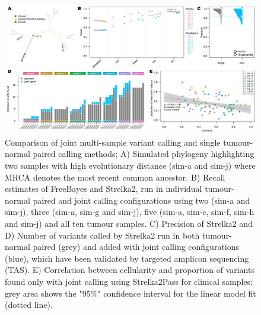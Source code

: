 \begin{figure}[!ht]
\centering
  \includegraphics[width=\textwidth]{Appendices/Variantcalling/Figure_1}\vspace*{-12pt}
  \caption[Comparison of joint multi-sample variant calling and single tumour-normal paired calling methods]{Comparison of joint multi-sample variant calling and single tumour-normal paired calling methods; A) Simulated phylogeny highlighting two samples with high evolutionary distance (sim-a and sim-j) where MRCA denotes the most recent common ancestor. B) Recall estimates of FreeBayes and Strelka2, run in individual tumour-normal paired and joint calling configurations using two (sim-a and sim-j), three (sim-a, sim-g and sim-j), five (sim-a, sim-c, sim-f, sim-h and sim-j) and all ten tumour samples. C) Precision of Strelka2 and D) Number of variants called by Strelka2 run in both tumour-normal paired (grey) and added with joint calling configurations (blue), which have been validated by targeted amplicon sequencing (TAS). E) Correlation between cellularity and proportion of variants found only with joint calling using Strelka2Pass for clinical samples; grey area shows the "$95\%$" confidence interval for the linear model fit (dotted line).}\label{A:fig:01}
\end{figure}

